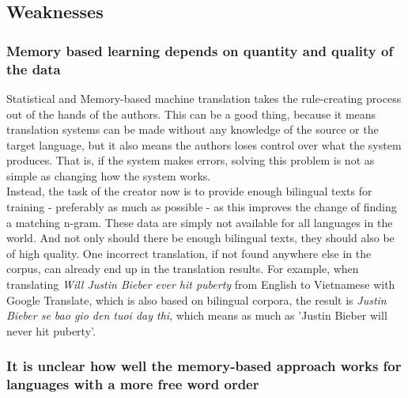 \documentclass[12pt]{article}
\begin{document}
\subsection{Weaknesses}

\subsubsection{Memory based learning depends on quantity and quality of the data}

Statistical and Memory-based machine translation takes the rule-creating process out of the hands of the authors. This can be a good thing, because it means translation systems can be made without any knowledge of the source or the target language, but it also means the authors loses control over what the system produces. That is, if the system makes errors, solving this problem is not as simple as changing how the system works. \\\indent
Instead, the task of the creator now is to provide enough bilingual texts for training - preferably as much as possible - as this improves the change of finding a matching n-gram. These data are simply not available for all languages in the world. And not only should there be enough bilingual texts, they should also be of high quality. One incorrect translation, if not found anywhere else in the corpus, can already end up in the translation results. For example, when translating \emph{Will Justin Bieber ever hit puberty} from English to Vietnamese with Google Translate, which is also based on bilingual corpora, the result is \emph{Justin Bieber se bao gio den tuoi day thi}, which means as much as 'Justin Bieber will never hit puberty'.

\subsubsection{It is unclear how well the memory-based approach works for languages with a more free word order}
\end{document}
